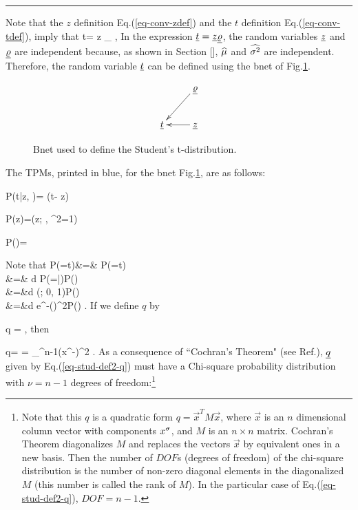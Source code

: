 \hrule{}

Note that the $z$ definition
Eq.(\ref{eq-conv-zdef})
and the $t$ definition
Eq.(\ref{eq-conv-tdef}),
imply that
\beq
t= z
_{\varrho}
\;,
\eeq
In the
expression ${\underline{t}}={\underline{z}}\underline{\varrho}$,
the
 random variables
${\underline{z}}$ and $\underline{\varrho}$
are independent
because, as shown in Section
[],
 $\widehat{\mu}$
and $\widehat{\sigma^2}$
are independent.
Therefore, the random variable ${\underline{t}}$
can be defined using the bnet
of Fig.\ref{fig-stud-bnet}.

\begin{figure}[h!]
$$
\xymatrix{
&\ul{\varrho}\ar[ld]
\\
\rvt&\rvz\ar[l]
}
$$
\caption{Bnet used to define
the Student's t-distribution.}
\label{fig-stud-bnet}
\end{figure}
The TPMs, printed in blue,
for the bnet Fig.\ref{fig-stud-bnet},
are as follows:

\beq\color{blue}
P(t|z, \varrho)=
\delta(t- z\varrho)
\;\;\;
\eeq

\beq\color{blue}
P(z)=\caln(z; , \s^2=1)
\eeq

\beq\color{blue}
P(\varrho)=
\eeq

Note that
\beqa
P(\rvt=t)&=&
P(\rvz\ul{\varrho}=t)
\\
&=&
\int d\varrho\;
P(\rvz=|\varrho)P(\varrho)
\\
&=&\int d\varrho\;
\caln(; 0, 1)P(\varrho)
\\
&=&\int d\varrho\;
e^{-\;()^2}P(\varrho)
\;.
\eeqa
If we define $q$ by

\beq
q =
\;,
\label{eq-stud-def1-q}
\eeq
then

\beq
q=
=
\sum_{}^{n-1}(x^\s-\HAT{\mu})^2
\;.
\label{eq-stud-def2-q}
\eeq
As a consequence of
``Cochran's Theorem"
(see Ref.\cite{wiki-coch-theo}),
${\underline{q}}$ given
by Eq.(\ref{eq-stud-def2-q}) must have
a Chi-square probability
distribution with $\nu=n-1$
degrees of freedom:\footnote{Note
that this $q$
is a quadratic form
$q=\vec{x}^T M \vec{x}$,
where $\vec{x}$ is an $n$ dimensional
column vector with components
$x^\sigma$,
and $M$ is an $n\times n$ matrix.
Cochran's Theorem
diagonalizes $M$
and replaces the
vectors $\vec{x}$
by equivalent ones in a new
basis.
Then the number
of $DOF$s (degrees of freedom)
of the chi-square distribution
is the number of non-zero
diagonal elements in
 the diagonalized $M$
(this
number is called the rank of $M$).
In the particular case of
Eq.(\ref{eq-stud-def2-q}),
$DOF=n-1$.}

